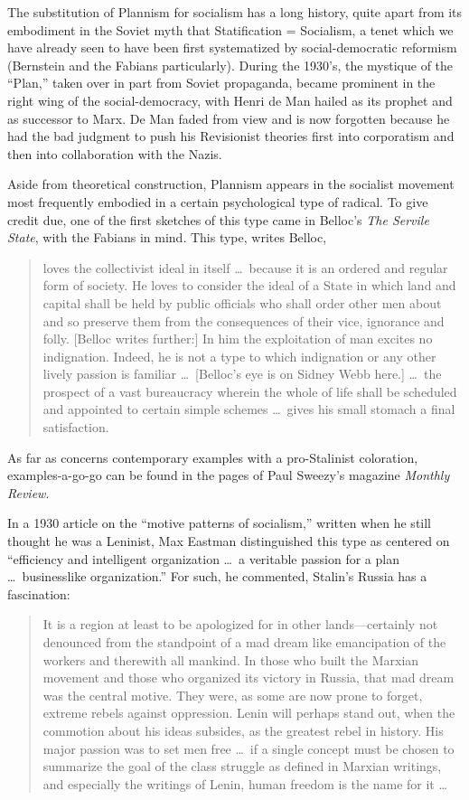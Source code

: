 The substitution of Plannism for socialism has a long history, quite apart from its embodiment in the Soviet myth that Statification = Socialism, a tenet which we have already seen to have been first systematized by social-democratic reformism (Bernstein and the Fabians particularly). During the 1930's, the mystique of the ``Plan,'' taken over in part from Soviet propaganda, became prominent in the right wing of the social-democracy, with Henri de Man hailed as its prophet and as successor to Marx. De Man faded from view and is now forgotten because he had the bad judgment to push his Revisionist theories first into corporatism and then into collaboration with the Nazis.

Aside from theoretical construction, Plannism appears in the socialist movement most frequently embodied in a certain psychological type of radical. To give credit due, one of the first sketches of this type came in Belloc's \emph{The Servile State}, with the Fabians in mind. This type, writes Belloc,

\blockquote{loves the collectivist ideal in itself \ldots\ because it is an ordered and regular form of society. He loves to consider the ideal of a State in which land and capital shall be held by public officials who shall order other men about and so preserve them from the consequences of their vice, ignorance and folly. [Belloc writes further:] In him the exploitation of man excites no indignation. Indeed, he is not a type to which indignation or any other lively passion is familiar \ldots\ [Belloc's eye is on Sidney Webb here.] \ldots\ the prospect of a vast bureaucracy wherein the whole of life shall be scheduled and appointed to certain simple schemes \ldots\ gives his small stomach a final satisfaction.}

As far as concerns contemporary examples with a pro-Stalinist coloration, examples-a-go-go can be found in the pages of Paul Sweezy's magazine \emph{Monthly Review}.

In a 1930 article on the ``motive patterns of socialism,'' written when he still thought he was a Leninist, Max Eastman distinguished this type as centered on ``efficiency and intelligent organization \ldots\ a veritable passion for a plan \ldots\ businesslike organization.'' For such, he commented, Stalin's Russia has a fascination:

\blockquote{It is a region at least to be apologized for in other lands---certainly not denounced from the standpoint of a mad dream like emancipation of the workers and therewith all mankind. In those who built the Marxian movement and those who organized its victory in Russia, that mad dream was the central motive. They were, as some are now prone to forget, extreme rebels against oppression. Lenin will perhaps stand out, when the commotion about his ideas subsides, as the greatest rebel in history. His major passion was to set men free \ldots\ if a single concept must be chosen to summarize the goal of the class struggle as defined in Marxian writings, and especially the writings of Lenin, human freedom is the name for it \ldots}

